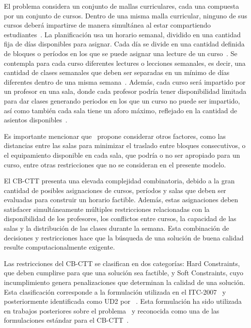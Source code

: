\documentclass[letter, 10pt]{article}
\begin{document}
El problema considera un conjunto de mallas curriculares, cada una compuesta por un conjunto de cursos. Dentro de una misma malla curricular, ninguno de sus cursos deber\'a impartirse de manera simult\'anea al estar compartiendo estudiantes~\cite{Bonutti2012Benchmarking,DiGaspero2007ITC}. La planificaci\'on usa un horario semanal, dividido en una cantidad fija de d\'ias disponibles para asignar. Cada d\'ia se divide en una cantidad definida de bloques o per\'iodos en los que se puede asignar una lecture de un curso~\cite{Bonutti2012Benchmarking,DiGaspero2007ITC}. Se contempla para cada curso diferentes lectures o lecciones semanales, es decir, una cantidad de clases semanales que deben ser separadas en un m\'inimo de d\'ias diferentes dentro de una misma semana~\cite{Bonutti2012Benchmarking,DiGaspero2007ITC}. Adem\'as, cada curso ser\'a impartido por un profesor en una sala, donde cada profesor podr\'ia tener disponibilidad limitada para dar clases generando periodos en los que un curso no puede ser impartido, as\'i como tambi\'en  cada sala tiene un aforo m\'aximo, reflejado en la cantidad de asientos disponibles~\cite{Bonutti2012Benchmarking,DiGaspero2007ITC}.

Es importante mencionar que~\cite{Bonutti2012Benchmarking} propone considerar otros factores, como las distancias entre las salas para minimizar el traslado entre bloques consecutivos, o el equipamiento disponible en cada sala, que podr\'ia o no ser apropiado para un curso, entre otras restricciones que no se consideran en el presente modelo.

El CB-CTT presenta una elevada complejidad combinatoria, debido a la gran cantidad de posibles asignaciones de cursos, per\'iodos y salas que deben ser evaluadas para construir un horario factible. Adem\'as, estas asignaciones deben satisfacer simult\'aneamente m\'ultiples restricciones relacionadas con la disponibilidad de los profesores, los conflictos entre cursos, la capacidad de las salas y la distribuci\'on de las clases durante la semana. Esta combinaci\'on de decisiones y restricciones hace que la b\'usqueda de una soluci\'on de buena calidad resulte computacionalmente exigente.

Las restricciones del CB-CTT se clasifican en dos categor\'ias: Hard Constraints, que deben cumplirse para que una soluci\'on sea factible, y Soft Constraints, cuyo incumplimiento genera penalizaciones que determinan la calidad de una soluci\'on. Esta clasificaci\'on corresponde a la formulaci\'on utilizada en el ITC-2007~\cite{DiGaspero2007ITC} y posteriormente identificada como UD2 por ~\cite{Bonutti2012Benchmarking}. Esta formulaci\'on ha sido utilizada en trabajos posteriores sobre el problema~\cite{Hao2011LowerBounds} y reconocida como una de las formulaciones est\'andar para el CB-CTT~\cite{Ceschia2023Educational}.
\end{document}
